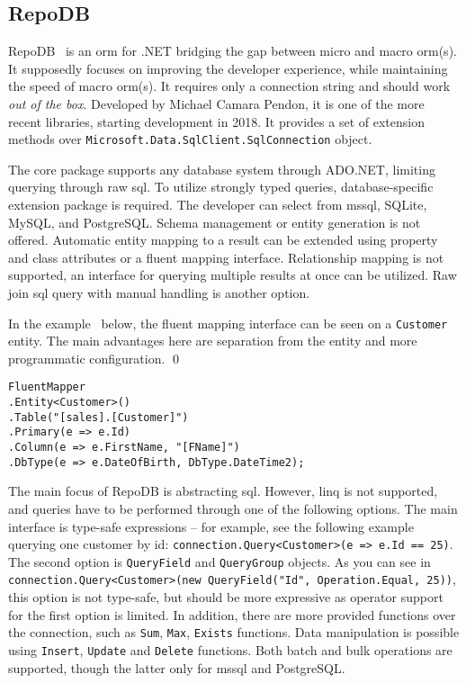 


\subsection{RepoDB}
RepoDB~\cite{RepoDB, RepoDBRepo} is an \acrshort{orm} for .NET bridging the gap between micro and macro \acrshort{orm}(s). It supposedly focuses on improving the developer experience, while maintaining the speed of macro \acrshort{orm}(s). It requires only a connection string and should work \textit{out of the box}. Developed by Michael Camara Pendon, it is one of the more recent libraries, starting development in 2018. It provides a set of extension methods over \texttt{Microsoft.Data.SqlClient.SqlConnection} object. 

The core package supports any database system through ADO.NET, limiting querying through raw \acrshort{sql}. To utilize strongly typed queries, database-specific extension package is required. The developer can select from \acrshort{mssql}, SQLite, MySQL, and PostgreSQL. Schema management or entity generation is not offered. Automatic entity mapping to a result can be extended using property and class attributes or a fluent mapping interface. Relationship mapping is not supported, an interface for querying multiple results at once can be utilized. Raw join \acrshort{sql} query with manual handling is another option.

\begin{example}
\small
In the example~\cite{RepoDB} below, the fluent mapping interface can be seen on a \texttt{Customer} entity. The main advantages here are separation from the entity and more programmatic configuration.
\qed

\begin{lstlisting}[language=CSharp]
FluentMapper
.Entity<Customer>()
.Table("[sales].[Customer]")
.Primary(e => e.Id)
.Column(e => e.FirstName, "[FName]")
.DbType(e => e.DateOfBirth, DbType.DateTime2);
\end{lstlisting}
\end{example}

The main focus of RepoDB is abstracting \acrshort{sql}. However, \acrshort{linq} is not supported, and queries have to be performed through one of the following options. The main interface is type-safe expressions -- for example, see the following example querying one customer by id: \lstinline{connection.Query<Customer>(e => e.Id == 25)}. The second option is \texttt{QueryField} and \texttt{QueryGroup} objects. As you can see in \lstinline{connection.Query<Customer>(new QueryField("Id", Operation.Equal, 25))}, this option is not type-safe, but should be more expressive as operator support for the first option is limited. In addition, there are more provided functions over the connection, such as \texttt{Sum}, \texttt{Max}, \texttt{Exists} functions. Data manipulation is possible using \texttt{Insert}, \texttt{Update} and \texttt{Delete} functions. Both batch and bulk operations are supported, though the latter only for \acrshort{mssql} and PostgreSQL.

